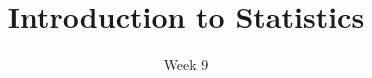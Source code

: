 \title{Introduction to Statistics}
\date{Week 9}





\thispagestyle{plain}
\graphicspath{{lectures/week08/}}




